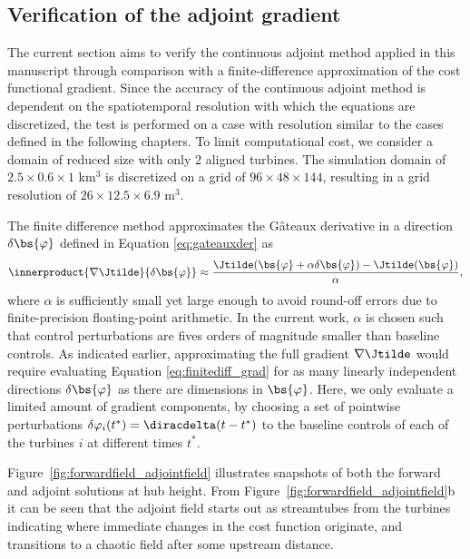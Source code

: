 	\subsection{Verification of the adjoint gradient}\label{sec:problem_verification}
	The current section aims to verify the continuous adjoint method applied in this manuscript through comparison with a finite-difference approximation of the cost functional gradient. Since the accuracy of the continuous adjoint method is dependent on the spatiotemporal resolution with which the equations are discretized, the test is performed on a case with resolution similar to the cases defined in the following chapters. To limit computational cost, we consider a domain of reduced size with only 2 aligned turbines. The simulation domain of $2.5 \times 0.6 \times 1$ km$^3$ is discretized on a grid of $96 \times 48 \times 144$, resulting in a grid resolution of $26 \times 12.5 \times 6.9$ m$^3$. 
	
	The finite difference method approximates the G\^ateaux derivative in a direction $\delta \bs{\varphi}$ defined in Equation \eqref{eq:gateauxder} as
	\begin{equation}\label{eq:finitediff_grad}
		\innerproduct{\nabla \Jtilde}{\delta \bs{\varphi}} \approx \frac{\Jtilde(\bs{\varphi} + \alpha \delta \bs{\varphi}) - \Jtilde(\bs{\varphi})}{\alpha},
	\end{equation}
	where $\alpha$ is sufficiently small yet large enough to avoid round-off errors due to finite-precision floating-point arithmetic. In the current work, $\alpha$ is chosen such that control perturbations are fives orders of magnitude smaller than baseline controls. As indicated earlier, approximating the full gradient $\nabla \Jtilde$ would require evaluating Equation \eqref{eq:finitediff_grad} for as many linearly independent directions $\delta \bs{\varphi}$ as there are dimensions in $\bs{\varphi}$. Here, we only evaluate a limited amount of gradient components, by choosing a set of pointwise perturbations $\delta \varphi_i(t^*) =\diracdelta(t-t^*)$ to the baseline controls of each of the turbines $i$ at different times $t^*$. 
	
	Figure~\ref{fig:forwardfield_adjointfield} illustrates snapshots of both the forward and adjoint solutions at hub height. From Figure~\ref{fig:forwardfield_adjointfield}b it can be seen that the adjoint field starts out as streamtubes from the turbines indicating where immediate changes in the cost function originate, and transitions to a chaotic field after some upstream distance. 
	
